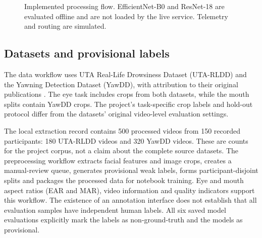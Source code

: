 \documentclass[pdflatex,sn-mathphys-num]{sn-jnl}
\begin{document}
\begin{figure}[htbp]
\centering
{}
\caption{Implemented processing flow. EfficientNet-B0 and ResNet-18 are evaluated offline and are not loaded by the live service. Telemetry and routing are simulated.}\label{fig:architecture}
\end{figure}

\subsection{Datasets and provisional labels}
The data workflow uses UTA Real-Life Drowsiness Dataset (UTA-RLDD) and the Yawning Detection Dataset (YawDD), with attribution to their original publications \cite{ghoddoosian2019rldd,abtahi2014yawdd}. The eye task includes crops from both datasets, while the mouth splits contain YawDD crops. The project's task-specific crop labels and hold-out protocol differ from the datasets' original video-level evaluation settings.

The local extraction record contains 500 processed videos from 150 recorded participants: 180 UTA-RLDD videos and 320 YawDD videos. These are counts for the project corpus, not a claim about the complete source datasets. The preprocessing workflow extracts facial features and image crops, creates a manual-review queue, generates provisional weak labels, forms participant-disjoint splits and packages the processed data for notebook training. Eye and mouth aspect ratios (EAR and MAR), video information and quality indicators support this workflow. The existence of an annotation interface does not establish that all evaluation samples have independent human labels. All six saved model evaluations explicitly mark the labels as non-ground-truth and the models as provisional.
\end{document}
